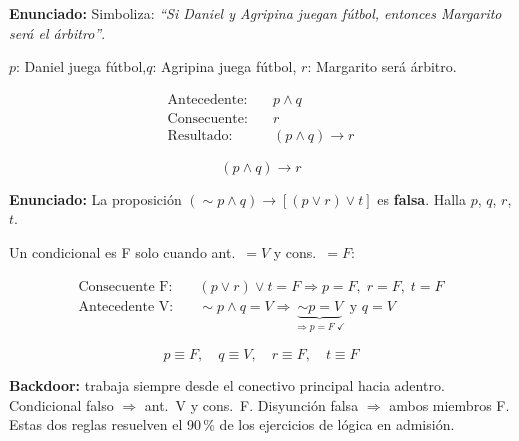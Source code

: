	\begin{cajaejemplo}[2 — Simbolización]
		\textbf{Enunciado:} Simboliza: \textit{``Si Daniel y Agripina juegan fútbol,
			entonces Margarito será el árbitro''}.
		
		\medskip
		$p$: Daniel juega fútbol,\quad $q$: Agripina juega fútbol,\quad
		$r$: Margarito será árbitro.
		
		\begin{align*}
			\text{Antecedente:} &\quad p \wedge q \\
			\text{Consecuente:} &\quad r \\
			\text{Resultado:}   &\quad (p \wedge q) \to r
		\end{align*}
		
		\begin{tcolorbox}[colback=AzulClaro!50, colframe=AzulPizarra,
			arc=2pt, boxrule=0.7pt]
			\[\boxed{(p \wedge q) \to r}\]
		\end{tcolorbox}
	\end{cajaejemplo}
	
	\begin{cajaejemplo}
		\textbf{Enunciado:} La proposición $(\sim p \wedge q) \to [(p \vee r) \vee t]$
		es \textbf{falsa}. Halla $p$, $q$, $r$, $t$.
		
		\medskip
		\noindent Un condicional es F solo cuando ant.~$= V$ y cons.~$= F$:
		
		\begin{align*}
			\text{Consecuente F:}&\quad
			(p \vee r) \vee t = F \Rightarrow p=F,\;r=F,\;t=F \\
			\text{Antecedente V:}&\quad
			\sim p \wedge q = V \Rightarrow \underbrace{\sim p=V}_{\Rightarrow p=F\;\checkmark}
			\text{ y } q=V
		\end{align*}
		
		\begin{tcolorbox}[colback=AzulClaro!50, colframe=AzulPizarra,
			arc=2pt, boxrule=0.7pt]
			\[\boxed{p \equiv F,\quad q \equiv V,\quad r \equiv F,\quad t \equiv F}\]
		\end{tcolorbox}
		
		\begin{cajatip}
			\textbf{Backdoor:} trabaja siempre desde el conectivo principal hacia adentro.
			Condicional falso $\Rightarrow$ ant.~V y cons.~F.
			Disyunción falsa $\Rightarrow$ ambos miembros F. Estas dos reglas resuelven
			el 90\,\% de los ejercicios de lógica en admisión.
		\end{cajatip}
	\end{cajaejemplo}
	
